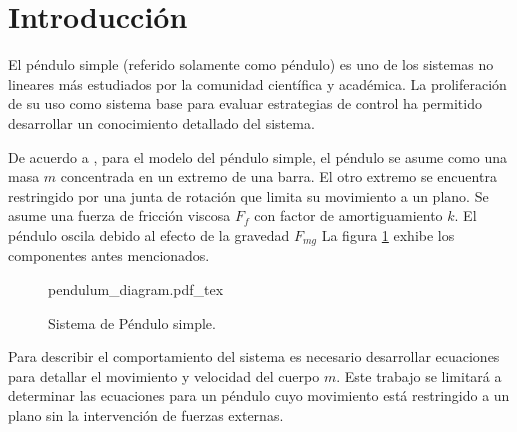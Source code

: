 \section{Introducción}

El péndulo simple (referido solamente como péndulo) es uno 
de los sistemas no lineares más estudiados por la 
comunidad científica y académica. La proliferación de su
uso como sistema base para evaluar estrategias de control ha
permitido desarrollar un conocimiento detallado del sistema.


De acuerdo a \cite{sastry}, para el modelo del péndulo simple, 
el péndulo se asume como una masa $m$ concentrada en un extremo
de una barra. El otro extremo se encuentra restringido por una
junta de rotación que limita su movimiento a un plano. 
Se asume una fuerza de fricción viscosa $F_f$ con factor de amortiguamiento
 $k$. El péndulo oscila debido al efecto de la gravedad $F_{mg}$
La figura \ref{fig: simple pendulum} exhibe los componentes antes 
mencionados.


 \begin{figure}[ht]
    \centering
    {pendulum_diagram.pdf_tex}
    \caption{Sistema de Péndulo simple.}
    \label{fig: simple pendulum}
\end{figure}

Para describir el comportamiento del sistema es necesario desarrollar
ecuaciones para detallar el movimiento y velocidad del cuerpo $m$.
Este trabajo se limitará a determinar las ecuaciones para un péndulo
cuyo movimiento está restringido a un plano sin la intervención de fuerzas
externas.


